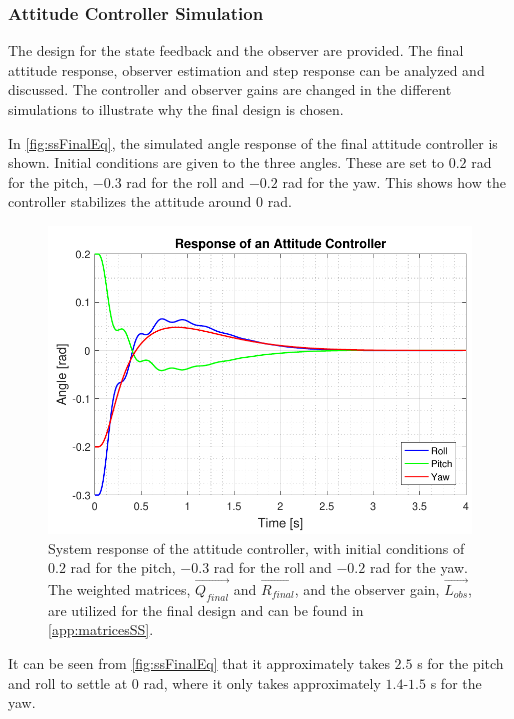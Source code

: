 \subsubsection{Attitude Controller Simulation}\label{sec:AttSim}
The design for the state feedback and the observer are provided. The final attitude response, observer estimation and step response can be analyzed and discussed. The controller and observer gains are changed in the different simulations to illustrate why the final design is chosen.


In \autoref{fig:ssFinalEq}, the simulated angle response of the final attitude controller is shown. Initial conditions are given to the three angles. These are set to $0.2$ rad for the pitch, $-0.3$ rad for the roll and $-0.2$ rad for the yaw. This shows how the controller stabilizes the attitude around 0 rad.
%
\begin{figure}[H]
	\centering
	\includegraphics[scale=0.7]{figures/ssFinalEq.pdf}
	\caption{System response of the attitude controller, with initial conditions of $0.2$ rad for the pitch, $-0.3$ rad for the roll and $-0.2$ rad for the yaw. The weighted matrices, $\vec{Q_{final}}$ and $\vec{R_{final}}$, and the observer gain, $\vec{L_{obs}}$, are utilized for the final design and can be found in \autoref{app:matricesSS}. }
	\label{fig:ssFinalEq}
\end{figure}
%
It can be seen from \autoref{fig:ssFinalEq} that it approximately takes $2.5$ \si{s} for the pitch and roll to settle at 0 rad, where it only takes approximately $1.4$-$1.5$ \si{s} for the yaw.

